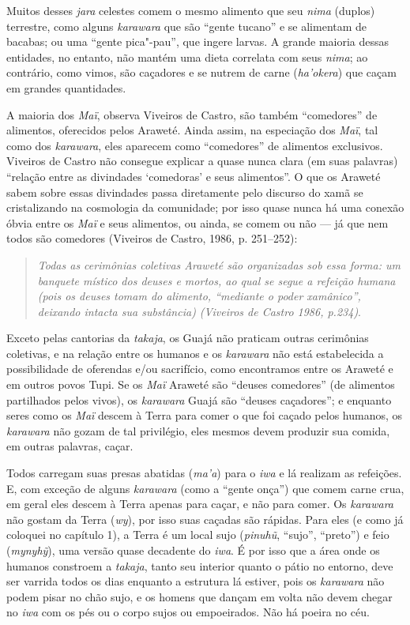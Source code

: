 Muitos desses \emph{jara} celestes comem o mesmo alimento que seu
\emph{nima} (duplos) terrestre, como alguns \emph{karawara} que são
``gente tucano'' e se alimentam de bacabas; ou uma ``gente pica"-pau'',
que ingere larvas. A grande maioria dessas entidades, no entanto, não
mantém uma dieta correlata com seus \emph{nima}; ao contrário, como
vimos, são caçadores e se nutrem de carne (\emph{ha'okera}) que caçam em
grandes quantidades.

A maioria dos \emph{Maï}, observa Viveiros de Castro, são também
``comedores'' de alimentos, oferecidos pelos Araweté. Ainda assim, na
especiação dos \emph{Maï}, tal como dos \emph{karawara}, eles aparecem
como ``comedores'' de alimentos exclusivos. Viveiros de Castro não
consegue explicar a quase nunca clara (em suas palavras) ``relação entre
as divindades `comedoras' e seus alimentos''. O que os Araweté sabem
sobre essas divindades passa diretamente pelo discurso do xamã se
cristalizando na cosmologia da comunidade; por isso quase nunca há uma
conexão óbvia entre os \emph{Maï} e seus alimentos, ou ainda, se comem
ou não --- já que nem todos são comedores (Viveiros de Castro, 1986, p.
251--252):

\begin{quote}
\emph{Todas as cerimônias coletivas Araweté são organizadas sob essa forma: um
banquete místico dos deuses e mortos, ao qual se segue a refeição humana
(pois os deuses tomam do alimento, ``mediante o poder xamânico'', deixando
intacta sua substância) (Viveiros de Castro 1986, p.234)}.
\end{quote}

Exceto pelas cantorias da \emph{takaja}, os Guajá não praticam outras
cerimônias coletivas, e na relação entre os humanos e os \emph{karawara}
não está estabelecida a possibilidade de oferendas e/ou sacrifício, como
encontramos entre os Araweté e em outros povos Tupi. Se os \emph{Maï}
Araweté são ``deuses comedores'' (de alimentos partilhados pelos vivos),
os \emph{karawara} Guajá são ``deuses caçadores''; e enquanto seres como
os \emph{Maï} descem à Terra para comer o que foi caçado pelos humanos,
os \emph{karawara} não gozam de tal privilégio, eles mesmos devem
produzir sua comida, em outras palavras, caçar.

Todos carregam suas presas abatidas (\emph{ma'a}) para o \emph{iwa} e lá
realizam as refeições. E, com exceção de alguns \emph{karawara} (como a
``gente onça'') que comem carne crua, em geral eles descem à Terra
apenas para caçar, e não para comer. Os \emph{karawara} não gostam da
Terra (\emph{wy}), por isso suas caçadas são rápidas. Para eles (e como
já coloquei no capítulo 1), a Terra é um local sujo (\emph{pinuhũ},
``sujo'', ``preto'') e feio (\emph{mynyhỹ}), uma versão quase decadente do
\emph{iwa}. É por isso que a área onde os humanos constroem a
\emph{takaja}, tanto seu interior quanto o pátio no entorno, deve ser
varrida todos os dias enquanto a estrutura lá estiver, pois os
\emph{karawara} não podem pisar no chão sujo, e os homens que dançam em
volta não devem chegar no \emph{iwa} com os pés ou o corpo sujos ou
empoeirados. Não há poeira no céu.

